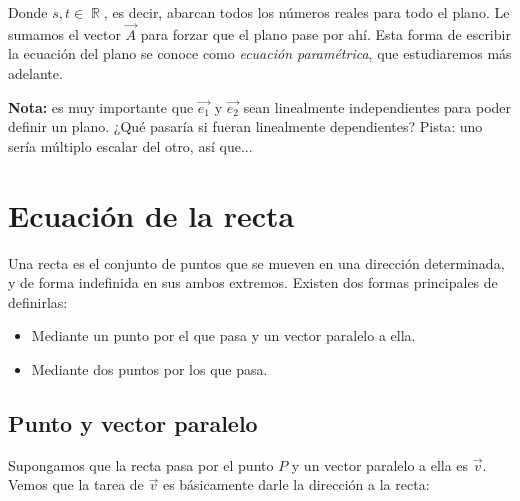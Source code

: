 \documentclass[12pt, fleqn]{report}                             %
\newcommand \Quote {\qq}                                        %
\theoremstyle{break}                                            %
\DeclareMathOperator \Reals        {\mathbb{R}}                 %
\newcommand{\lVec}[1]{\overrightarrow{#1}}                      %
\begin{document}
            Donde $s, t \in \Reals$, es decir, abarcan todos los números reales para \Quote{barrer} todo el plano. Le sumamos el vector $\vec{A}$ para forzar que el plano pase por ahí. Esta forma de escribir la ecuación del plano se conoce como \emph{ecuación paramétrica}, que estudiaremos más adelante.
            
            \textbf{Nota:} es muy importante que $\lVec{e_1}$ y $\lVec{e_2}$ sean linealmente independientes para poder definir un plano. ¿Qué pasaría si fueran linealmente dependientes? Pista: uno sería múltiplo escalar del otro, así que...
            
        
        \clearpage
            
        \section{Ecuación de la recta}
        
        Una recta es el conjunto de puntos que se mueven en una dirección determinada, y de forma indefinida en sus ambos extremos. Existen dos formas principales de definirlas: \begin{itemize}\setlength\itemsep{0em}
            \item Mediante un punto por el que pasa y un vector paralelo a ella.
            \item Mediante dos puntos por los que pasa.
        \end{itemize}
    
            
            \clearpage
    
            \subsection{Punto y vector paralelo}
            
            Supongamos que la recta pasa por el punto $P$ y un vector paralelo a ella es $\vec{v}$. Vemos que la tarea de $\vec{v}$ es básicamente darle la dirección a la recta:
            
\end{document}
